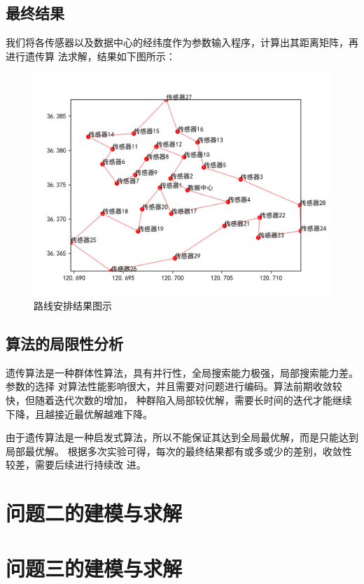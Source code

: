 \documentclass{ctexart}
\begin{document}
    \subsection{最终结果}
    我们将各传感器以及数据中心的经纬度作为参数输入程序，计算出其距离矩阵，再进行遗传算
    法求解，结果如下图所示：
    \begin{figure}[H]
        \centering
        \includegraphics[width=1\textwidth]{figure/path.png}
        \caption {路线安排结果图示}
    \end{figure}

    \subsection{算法的局限性分析}
    遗传算法是一种群体性算法，具有并行性，全局搜索能力极强，局部搜索能力差。参数的选择
    对算法性能影响很大，并且需要对问题进行编码。算法前期收敛较快，但随着迭代次数的增加，
    种群陷入局部较优解，需要长时间的迭代才能继续下降，且越接近最优解越难下降。

    由于遗传算法是一种启发式算法，所以不能保证其达到全局最优解，而是只能达到局部最优解。
    根据多次实验可得，每次的最终结果都有或多或少的差别，收敛性较差，需要后续进行持续改
    进。

    \section{问题二的建模与求解}
    \section{问题三的建模与求解}
\end{document}
